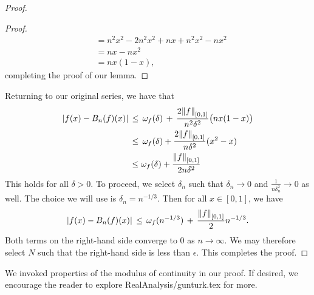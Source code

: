 \documentclass[11pt]{article}
\begin{document}
\begin{adjustwidth}{1cm}{}
\begin{proof}
\begin{adjustwidth}{1cm}{}
\begin{proof}
\begin{align*}
                                                           &= n^{2}x^{2} - 2n^{2}x^{2} + nx + n^{2}x^{2} - nx^{2} \\
                                                           &= nx - nx^{2} \\
                                                           &= nx(1 - x),
        \end{align*}
        completing the proof of our lemma.
      \end{proof}
    \end{adjustwidth}
    Returning to our original series, we have that
    \begin{align*}
      \abs{f(x) - B_{n}(f)(x)} \, &\le \, \omega_{f}(\delta) \, + \, \frac{2 \norm{f}_{[0, 1]}}{n^{2} \delta^{2}} \big( nx(1 - x) \big) \\
                                  &\le \, \omega_{f}(\delta) + \frac{2 \norm{f}_{[0, 1]}}{n \delta^{2}} (x^{2} - x) \\
                                  &\le \omega_{f}(\delta) + \frac{\norm{f}_{[0, 1]}}{2n \delta^{2}}
    \end{align*}
    This holds for all $\delta > 0$. To proceed, we select $\delta_{n}$ such that $\delta_{n} \to 0$ and $\tfrac{1}{n \delta_{n}^{2}} \to 0$ as well. The choice we will use is $\delta_{n} = n^{-1/3}$. Then for all $x \in [0, 1]$, we have
    \[
      \abs{f(x) - B_{n}(f)(x)} \, \le \, \omega_{f}(n^{-1/3}) \, + \, \frac{\norm{f}_{[0, 1]}}{2} n^{-1 / 3}.
    \]
    Both terms on the right-hand side converge to $0$ as $n \to \infty$. We may therefore select $N$ such that the right-hand side is less than $\epsilon$. This completes the proof.
  \end{proof}
\end{adjustwidth}

We invoked properties of the modulus of continuity in our proof. If desired, we encourage the reader to explore RealAnalysis/gunturk.tex for more.

\end{document}
